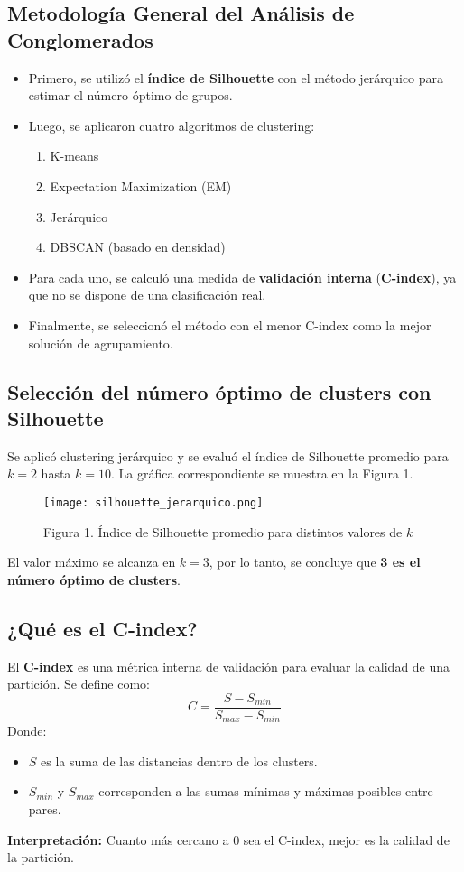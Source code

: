 \documentclass[12pt]{report}
\begin{document}
\subsection{Metodología General del Análisis de Conglomerados}
\begin{itemize}
    \item Primero, se utilizó el \textbf{índice de Silhouette} con el método jerárquico para estimar el número óptimo de grupos.
    \item Luego, se aplicaron cuatro algoritmos de clustering:
    \begin{enumerate}
        \item K-means
        \item Expectation Maximization (EM)
        \item Jerárquico
        \item DBSCAN (basado en densidad)
    \end{enumerate}
    \item Para cada uno, se calculó una medida de \textbf{validación interna} (\textbf{C-index}), ya que no se dispone de una clasificación real.
    \item Finalmente, se seleccionó el método con el menor C-index como la mejor solución de agrupamiento.
\end{itemize}

\subsection{Selección del número óptimo de clusters con Silhouette}
Se aplicó clustering jerárquico y se evaluó el índice de Silhouette promedio para \(k = 2\) hasta \(k = 10\). La gráfica correspondiente se muestra en la Figura 1.

\begin{figure}[H]
    \centering
    \texttt{[image: silhouette\_jerarquico.png]}
    \caption{Figura 1. Índice de Silhouette promedio para distintos valores de \(k\)}
\end{figure}

\noindent El valor máximo se alcanza en \(k = 3\), por lo tanto, se concluye que \textbf{3 es el número óptimo de clusters}.

\subsection{¿Qué es el C-index?}
El \textbf{C-index} es una métrica interna de validación para evaluar la calidad de una partición. Se define como:
\[ C = \frac{S - S_{min}}{S_{max} - S_{min}} \]
Donde:
\begin{itemize}
    \item $S$ es la suma de las distancias dentro de los clusters.
    \item $S_{min}$ y $S_{max}$ corresponden a las sumas mínimas y máximas posibles entre pares.
\end{itemize}
\textbf{Interpretación:} Cuanto más cercano a 0 sea el C-index, mejor es la calidad de la partición.
\end{document}
